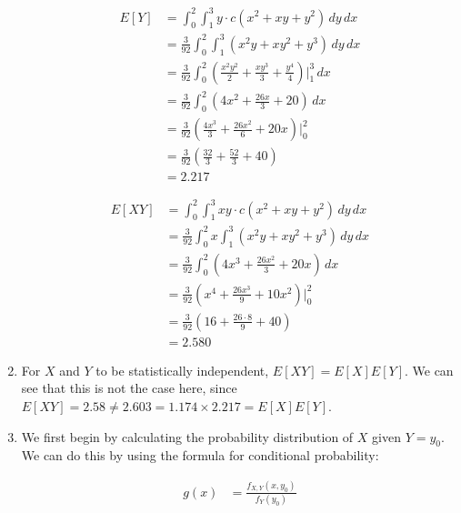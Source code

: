 \documentclass[a4paper]{article}
\begin{document}
\begin{enumerate}[label=(\alph*)]
    \begin{align*}
        E[Y] &= \int_{0}^{2} \int_{1}^{3} y \cdot c(x^2 + xy + y^2) \, dy \, dx \\
        &= \frac{3}{92} \int_{0}^{2} \int_{1}^{3} \left( x^2y + xy^2 + y^3 \right) \, dy \, dx \\
        &= \frac{3}{92} \int_{0}^{2} \left( \frac{x^2 y^2}{2} + \frac{xy^3}{3} + \frac{y^4}{4} \right) \bigg|_{1}^{3} \, dx \\
        &= \frac{3}{92} \int_{0}^{2} \left( 4x^2 + \frac{26x}{3} + 20 \right) \, dx \\
        &= \frac{3}{92} \left( \frac{4x^3}{3} + \frac{26x^2}{6} + 20x \right) \bigg|_{0}^{2} \\
        &= \frac{3}{92} \left( \frac{32}{3} + \frac{52}{3} + 40 \right) \\
        &= 2.217
    \end{align*}

    \begin{align*}
        E[XY] &= \int_{0}^{2} \int_{1}^{3} xy \cdot c(x^2 + xy + y^2) \, dy \, dx \\
        &= \frac{3}{92} \int_{0}^{2} x \int_{1}^{3} \left( x^2y + xy^2 + y^3 \right) \, dy \, dx \\
        &= \frac{3}{92} \int_{0}^{2} \left(4x^3  + \frac{26x^2}{3} + 20x \right) \, dx \\
        &= \frac{3}{92} \left( x^4 + \frac{26x^3}{9} + 10x^2 \right) \bigg|_{0}^{2} \\
        &= \frac{3}{92} \left( 16 + \frac{26 \cdot 8}{9} + 40 \right) \\
        &= 2.580
    \end{align*}

    \vspace{5mm}
    \item For $X$ and $Y$ to be statistically independent, $E[XY] = E[X]E[Y]$. We can see that this is not the case here, since $E[XY] = 2.58 \neq 2.603 = 1.174 \times 2.217 = E[X]E[Y]$.
    
    \vspace{5mm}
    \item We first begin by calculating the probability distribution of $X$ given $Y = y_0$. We can do this by using the formula for conditional probability:

    \begin{align*}
        g(x) &= \frac{f_{X,Y}(x, y_0)}{f_Y(y_0)}
    \end{align*}


\end{enumerate}
\end{document}
